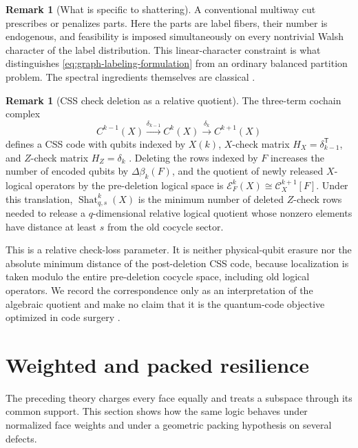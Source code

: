 \documentclass[11pt,letterpaper]{article}
\theoremstyle{plain}
\theoremstyle{definition}
\newtheorem{remark}[theorem]{Remark}
\newcommand{\cC}{\mathcal{C}}
\newcommand{\cE}{\mathcal{E}}
\newcommand{\Shat}{\operatorname{Shat}}
\newcommand{\1}{\mathbf{1}}
\begin{document}
\begin{remark}[What is specific to shattering]
A conventional multiway cut prescribes or penalizes parts.  Here the parts are label
fibers, their number is endogenous, and feasibility is imposed simultaneously on every
nontrivial Walsh character of the label distribution.  This linear-character constraint
is what distinguishes \eqref{eq:graph-labeling-formulation} from an ordinary balanced
partition problem.  The spectral ingredients themselves are classical
\cite{fiedler1973}.
\end{remark}

\begin{remark}[CSS check deletion as a relative quotient]\label{rem:css-interpretation}
The three-term cochain complex
\[
 C^{k-1}(X)\xrightarrow{\delta_{k-1}}C^k(X)
 \xrightarrow{\delta_k}C^{k+1}(X)
\]
defines a CSS code with qubits indexed by $X(k)$, $X$-check matrix
$H_X=\delta_{k-1}^{\mathsf T}$, and $Z$-check matrix $H_Z=\delta_k$
\cite{calderbankshor1996,steane1996,audouxcouvreur2019}.  Deleting the rows indexed by
$F$ increases the number of encoded qubits by $\Delta\beta_k(F)$, and the quotient of
newly released $X$-logical operators by the pre-deletion logical space is
$\cE_F^k(X)\cong\cC_X^{k+1}[F]$.  Under this translation,
$\Shat_{q,s}^k(X)$ is the minimum number of deleted $Z$-check rows needed to release a
$q$-dimensional relative logical quotient whose nonzero elements have distance at least
$s$ from the old cocycle sector.

This is a relative check-loss parameter.  It is neither physical-qubit erasure nor the
absolute minimum distance of the post-deletion CSS code, because localization is taken
modulo the entire pre-deletion cocycle space, including old logical operators.  We record
the correspondence only as an interpretation of the algebraic quotient and make no
claim that it is the quantum-code objective optimized in code surgery
\cite{cowtanburton2024}.
\end{remark}

\section{Weighted and packed resilience}
\label{sec:weighted}

The preceding theory charges every face equally and treats a subspace through its common
support.  This section shows how the same logic behaves under normalized face weights
and under a geometric packing hypothesis on several defects.
\end{document}
